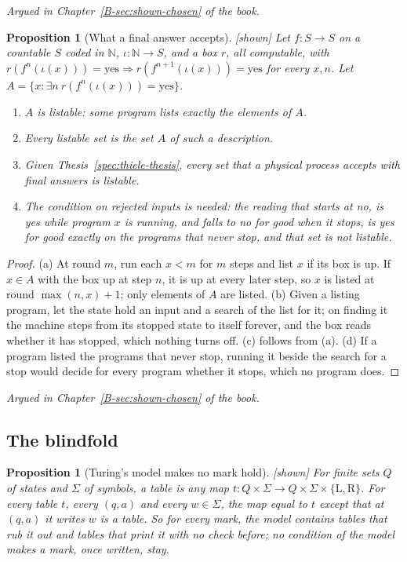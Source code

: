 \documentclass[11pt, a4paper]{article}
\theoremstyle{plain}
\newtheorem{proposition}[theorem]{Proposition}
\theoremstyle{definition}
\theoremstyle{remark}
\newcommand{\N}{\mathbb{N}}
\newcommand{\rd}{r}
\newcommand{\argued}[1]{\par\noindent\textit{Argued in Chapter~\ref{B-#1} of the book.}\par}
\newcommand{\kind}[1]{\textup{[#1]}}
\begin{document}
\argued{sec:shown-chosen}

\begin{proposition}[What a final answer accepts]\label{spec:listing} \kind{shown}
Let $f:S\to S$ on a countable $S$ coded in $\N$, $\iota:\N\to S$, and a box $\rd$, all computable, with
$\rd(f^n(\iota(x)))=\mathrm{yes}\Rightarrow\rd(f^{n+1}(\iota(x)))=\mathrm{yes}$ for every $x,n$. Let
$A=\{x:\exists n\ \rd(f^n(\iota(x)))=\mathrm{yes}\}$.
\begin{enumerate}[label=(\alph*)]
\item $A$ is listable: some program lists exactly the elements of $A$.
\item Every listable set is the set $A$ of such a description.
\item Given Thesis~\ref{spec:thiele-thesis}, every set that a physical process accepts with final answers is
listable.
\item The condition on rejected inputs is needed: the reading that starts at no, is yes while program $x$ is
running, and falls to no for good when it stops, is yes for good exactly on the programs that never stop,
and that set is not listable.
\end{enumerate}
\end{proposition}

\begin{proof}
(a) At round $m$, run each $x<m$ for $m$ steps and list $x$ if its box is up. If $x\in A$ with the box up at step
$n$, it is up at every later step, so $x$ is listed at round $\max(n,x)+1$; only elements of $A$ are listed.
(b) Given a listing program, let the state hold an input and a search of the list for it; on finding it the
machine steps from its stopped state to itself forever, and the box reads whether it has stopped, which
nothing turns off. (c) follows from (a). (d) If a program listed the programs that never stop, running it beside
the search for a stop would decide for every program whether it stops, which no program does.
\end{proof}

\argued{sec:shown-chosen}

\subsection*{The blindfold}

\begin{proposition}[Turing's model makes no mark hold]\label{spec:blind-turing} \kind{shown}
For finite sets $Q$ of states and $\Sigma$ of symbols, a table is any map
$t:Q\times\Sigma\to Q\times\Sigma\times\{\mathrm{L},\mathrm{R}\}$. For every table $t$, every $(q,a)$ and every
$w\in\Sigma$, the map equal to $t$ except that at $(q,a)$ it writes $w$ is a table. So for every mark, the
model contains tables that rub it out and tables that print it with no check before; no condition of the
model makes a mark, once written, stay.
\end{proposition}
\end{document}
